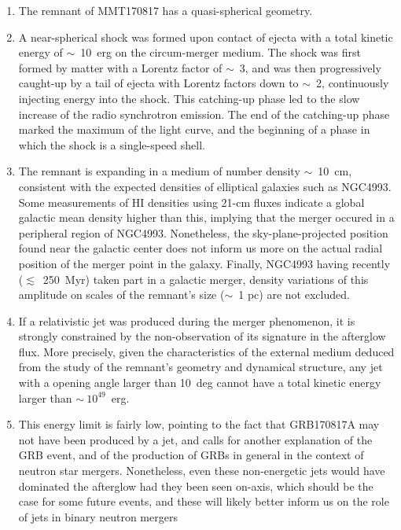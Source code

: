 \begin{enumerate}
    \item The remnant of MMT170817 has a quasi-spherical geometry.
    \item A near-spherical shock was formed upon contact of ejecta with a total kinetic energy of $\sim$~10~erg on the circum-merger medium. The shock was first formed by matter with a Lorentz factor of $\sim$~3, and was then progressively caught-up by a tail of ejecta with Lorentz factors down to $\sim$~2, continuously injecting energy into the shock. This catching-up phase led to the slow increase of the radio synchrotron emission. The end of the catching-up phase marked the maximum of the light curve, and the beginning of a phase in which the shock is a single-speed shell.

    \item The remnant is expanding in a medium of number density $\sim$~10~cm, consistent with the expected densities of elliptical galaxies such as NGC4993. Some measurements of HI densities using 21-cm fluxes indicate a global galactic mean density higher than this, implying that the merger occured in a peripheral region of NGC4993. Nonetheless, the sky-plane-projected position found near the galactic center does not inform us more on the actual radial position of the merger point in the galaxy. Finally, NGC4993 having recently ($\lesssim$~250~Myr) taken part in a galactic merger, density variations of this amplitude on scales of the remnant's size ($\sim$~1 pc) are not excluded.

    \item If a relativistic jet was produced during the merger phenomenon, it is strongly constrained by the non-observation of its signature in the afterglow flux. More precisely, given the characteristics of the external medium deduced from the study of the remnant's geometry and dynamical structure, any jet with a opening angle larger than 10~deg cannot have a total kinetic energy larger than $\sim~10^{49}$~erg.

    \item This energy limit is fairly low, pointing to the fact that GRB170817A may not have been produced by a jet, and calls for another explanation of the GRB event, and of the production of GRBs in general in the context of neutron star mergers. Nonetheless, even these non-energetic jets would have dominated the afterglow had they been seen on-axis, which should be the case for some future events, and these will likely better inform us on the role of jets in binary neutron mergers
\end{enumerate}
